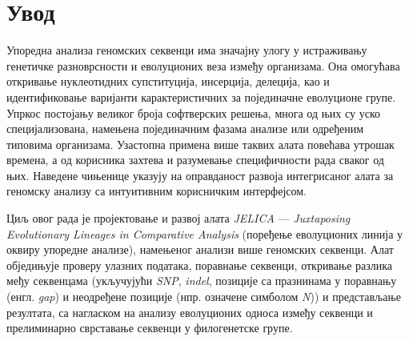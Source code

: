 \documentclass[12pt,oneside]{memoir}
\begin{document}
\frontmatter
\naslovna
\komisija
\apstrakt
\tableofcontents*

\mainmatter

\chapter{Увод}
Упоредна анализа геномских секвенци има значајну улогу у истраживању генетичке разноврсности и еволуционих веза између организама. Она омогућава откривање нуклеотидних супституција, инсерција, делеција, као и идентификовање варијанти карактеристичних за појединачне еволуционе групе. Упркос постојању великог броја софтверских решења, многа од њих су уско специјализована, намењена појединачним фазама анализе или одређеним типовима организама. Узастопна примена више таквих алата повећава утрошак времена, а од корисника захтева и разумевање специфичности рада сваког од њих. Наведене чињенице указују на оправданост развоја интегрисаног алата за геномску анализу са интуитивним корисничким интерфејсом.

Циљ овог рада је пројектовање и развој алата \textit{JELICA} — \textit{Juxtaposing Evolutionary Lineages in Comparative Analysis} (поређење еволуционих линија у оквиру упоредне анализе), намењеног анализи више геномских секвенци. Алат обједињује проверу улазних података, поравнање секвенци, откривање разлика међу секвенцама (укључујући \textit{SNP}, \textit{indel}, позиције са празнинама у поравнању (енгл. \textit{gap}) и неодређене позиције (нпр. означене симболом \textit{N})) и представљање резултата, са нагласком на анализу еволуционих односа између секвенци и прелиминарно сврставање секвенци у филогенетске групе. 
\end{document}
